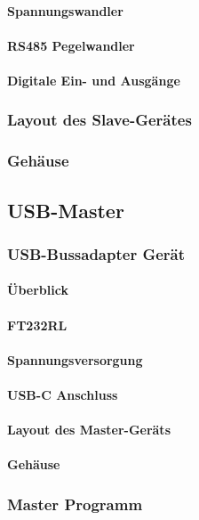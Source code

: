 \paragraph{Spannungswandler}
\paragraph{RS485 Pegelwandler}
\paragraph{Digitale Ein- und Ausgänge}
\subsubsection{Layout des Slave-Gerätes}
\subsubsection{Gehäuse}


\subsection{USB-Master}
\subsubsection{USB-Bussadapter Gerät}
\paragraph{Überblick}
\paragraph{FT232RL}
\paragraph{Spannungsversorgung}
\paragraph{USB-C Anschluss}
\paragraph{Layout des Master-Geräts}
\paragraph{Gehäuse}

\subsubsection{Master Programm}
